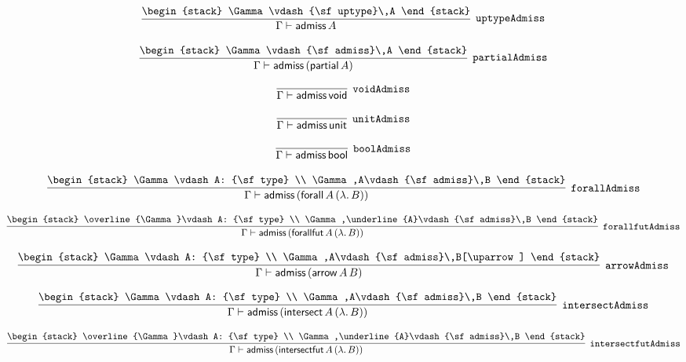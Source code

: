 \[
\infer[{\tt uptypeAdmiss}]{\Gamma \vdash {\sf admiss}\,A}{
\begin{stack}
\Gamma \vdash {\sf uptype}\,A
\end{stack}}
\]

\[
\infer[{\tt partialAdmiss}]{\Gamma \vdash {\sf admiss}\,({\sf partial}\,A)}{
\begin{stack}
\Gamma \vdash {\sf admiss}\,A
\end{stack}}
\]

\[
\infer[{\tt voidAdmiss}]{\Gamma \vdash {\sf admiss}\,{\sf void}}{}
\]

\[
\infer[{\tt unitAdmiss}]{\Gamma \vdash {\sf admiss}\,{\sf unit}}{}
\]

\[
\infer[{\tt boolAdmiss}]{\Gamma \vdash {\sf admiss}\,{\sf bool}}{}
\]

\[
\infer[{\tt forallAdmiss}]{\Gamma \vdash {\sf admiss}\,({\sf forall}\,A\,(\lambda .\,B))}{
\begin{stack}
\Gamma \vdash A: {\sf type}
\\
\Gamma ,A\vdash {\sf admiss}\,B
\end{stack}}
\]

\[
\infer[{\tt forallfutAdmiss}]{\Gamma \vdash {\sf admiss}\,({\sf forallfut}\,A\,(\lambda .\,B))}{
\begin{stack}
\overline{\Gamma}\vdash A: {\sf type}
\\
\Gamma ,\underline{A}\vdash {\sf admiss}\,B
\end{stack}}
\]

\[
\infer[{\tt arrowAdmiss}]{\Gamma \vdash {\sf admiss}\,({\sf arrow}\,A\,B)}{
\begin{stack}
\Gamma \vdash A: {\sf type}
\\
\Gamma ,A\vdash {\sf admiss}\,B[\uparrow ]
\end{stack}}
\]

\[
\infer[{\tt intersectAdmiss}]{\Gamma \vdash {\sf admiss}\,({\sf intersect}\,A\,(\lambda .\,B))}{
\begin{stack}
\Gamma \vdash A: {\sf type}
\\
\Gamma ,A\vdash {\sf admiss}\,B
\end{stack}}
\]

\[
\infer[{\tt intersectfutAdmiss}]{\Gamma \vdash {\sf admiss}\,({\sf intersectfut}\,A\,(\lambda .\,B))}{
\begin{stack}
\overline{\Gamma}\vdash A: {\sf type}
\\
\Gamma ,\underline{A}\vdash {\sf admiss}\,B
\end{stack}}
\]

